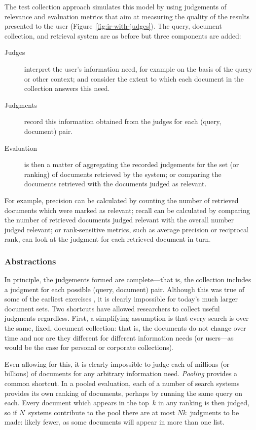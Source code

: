 The test collection approach simulates this model by using judgements of relevance and evaluation metrics that aim at measuring the quality of the results presented to the user  (Figure~\ref{fig:ir-with-judges}). The query, document collection, and retrieval system are as before but three components are added:

\begin{description}
	\item[Judges] interpret the user's information need, for example on the basis of the query or other context; and consider the extent to which each document in the collection answers this need.
	
	\item[Judgments] record this information obtained from the judges for each (query, document) pair.
	
	\item[Evaluation] is then a matter of aggregating the recorded judgements for the set (or ranking) of documents retrieved by the system; or comparing the documents retrieved with the documents judged as relevant.
\end{description}

For example, precision can be calculated by counting the number of retrieved documents which were marked as relevant; recall can be calculated by comparing the number of retrieved documents judged relevant with the overall number judged relevant; or rank-sensitive metrics, such as average precision or reciprocal rank, can look at the judgment for each retrieved document in turn.

\subsubsection{Abstractions}

In principle, the judgements formed are complete---that is, the collection includes a judgment for each possible (query, document) pair. Although this was true of some of the earliest exercises \citep{cleverdon66}, it is clearly impossible for today's much larger document sets. Two shortcuts have allowed researchers to collect useful judgments regardless.  First, a simplifying assumption is that every search is over the same, fixed, document collection: that is, the documents do not change over time and nor are they different for different information needs (or users---as would be the case for personal or corporate collections).

Even allowing for this, it is clearly impossible to judge each of millions (or billions) of documents for any arbitrary information need. \emph{Pooling} provides a common shortcut. In a pooled evaluation, each of a number of search systems provides its own ranking of documents, perhaps by running the same query on each. Every document which appears in the top~$k$ in any ranking is then judged, so if $N$~systems contribute to the pool there are at most $Nk$~judgments to be made: likely fewer, as some documents will appear in more than one list.

